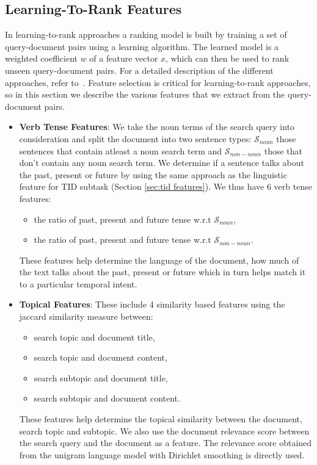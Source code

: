 \documentclass{sig-alternate}
\begin{document}
\subsection{Learning-To-Rank Features}\label{ltor_f}
In learning-to-rank approaches a ranking model is built by training a set of query-document pairs using a learning algorithm. The learned model is a weighted coefficient $w$ of a feature vector $x$, which can then be used to rank unseen query-document pairs. For a detailed description of the different approaches, refer to~\cite{ltor}. Feature selection is critical for learning-to-rank approaches, so in this section we describe the various features that we extract from the query-document pairs.
\begin{itemize}
\item\textbf{Verb Tense Features}: We take the noun terms of the search query into consideration and split the document into two sentence types: $\mathcal S_{noun}$ those sentences that contain atleast a noun search term and $\mathcal S_{non-noun}$ those that don't contain any noun search term. We determine if a sentence talks about the past, present or future by using the same approach as the linguistic feature for TID subtask (Section \ref{sec:tid features}). We thus have \textsf{6 verb tense features}: 
\begin{itemize}
\item the ratio of past, present and future tense w.r.t $\mathcal S_{noun}$,
\item the ratio of past, present and future tense w.r.t $\mathcal S_{non-noun}$. 
\end{itemize}
These features help determine the language of the document, how much of the text talks about the past, present or future which in turn helps match it to a particular temporal intent. 
\item\textbf{Topical Features}: These include \textsf{4 similarity based features} using the jaccard similarity measure between:
   \begin{itemize}
       \item search topic and document title,
       \item search topic and document content,
       \item search subtopic and document title, 
       \item search subtopic and document content. 
   \end{itemize}
These features help determine the topical similarity between the document, search topic and subtopic. We also use the \textsf{document relevance score} between the search query and the document as a feature. The relevance score obtained from the unigram language model with Dirichlet smoothing is directly used. 

\end{itemize}
\end{document}
